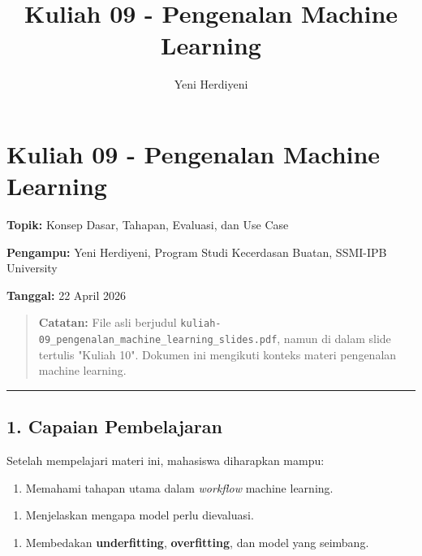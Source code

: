\documentclass[12pt,a4paper]{article}
\begin{document}
\title{Kuliah 09 - Pengenalan Machine Learning}
\author{Yeni Herdiyeni}
\date{}
\maketitle

\maketitle
\tableofcontents
\newpage

\section{Kuliah 09 - Pengenalan Machine Learning}

\textbf{Topik:} Konsep Dasar, Tahapan, Evaluasi, dan Use Case  

\textbf{Pengampu:} Yeni Herdiyeni, Program Studi Kecerdasan Buatan, SSMI-IPB University  

\textbf{Tanggal:} 22 April 2026


\begin{quote}
\textbf{Catatan:} File asli berjudul \texttt{kuliah-09_pengenalan_machine_learning_slides.pdf}, namun di dalam slide tertulis "Kuliah 10". Dokumen ini mengikuti konteks materi pengenalan machine learning.\end{quote}


\hrule


\subsection{1. Capaian Pembelajaran}

Setelah mempelajari materi ini, mahasiswa diharapkan mampu:


\begin{enumerate}
\item Memahami tahapan utama dalam \emph{workflow} machine learning.
\end{enumerate}

\begin{enumerate}
\item Menjelaskan mengapa model perlu dievaluasi.
\end{enumerate}

\begin{enumerate}
\item Membedakan \textbf{underfitting}, \textbf{overfitting}, dan model yang seimbang.
\end{enumerate}
\end{document}
